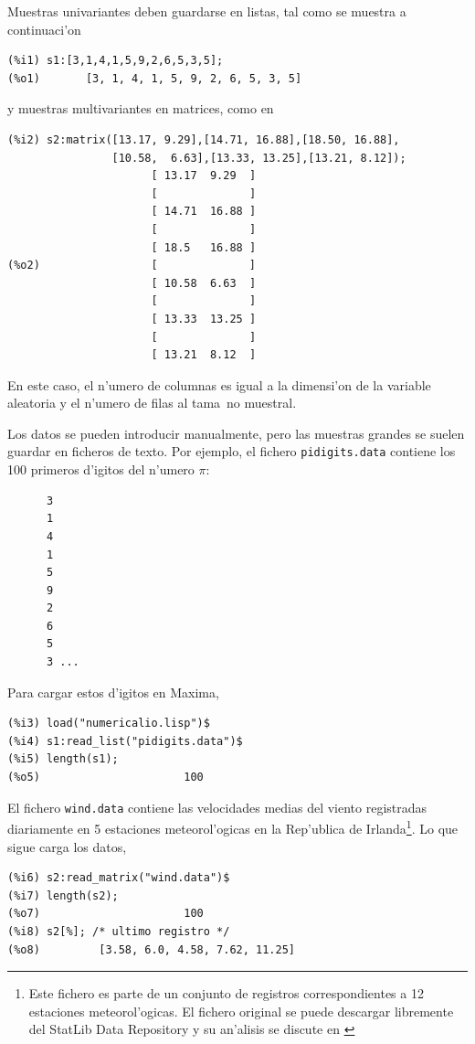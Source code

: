 \documentclass[spanish,12pt,a4paper]{article}
\begin{document}
Muestras univariantes deben guardarse en listas, tal como se muestra a continuaci'on
\begin{verbatim}
(%i1) s1:[3,1,4,1,5,9,2,6,5,3,5];
(%o1)       [3, 1, 4, 1, 5, 9, 2, 6, 5, 3, 5]
\end{verbatim}
y muestras multivariantes en matrices, como en
\begin{verbatim}
(%i2) s2:matrix([13.17, 9.29],[14.71, 16.88],[18.50, 16.88],
                [10.58,  6.63],[13.33, 13.25],[13.21, 8.12]);
                      [ 13.17  9.29  ]
                      [              ]
                      [ 14.71  16.88 ]
                      [              ]
                      [ 18.5   16.88 ]
(%o2)                 [              ]
                      [ 10.58  6.63  ]
                      [              ]
                      [ 13.33  13.25 ]
                      [              ]
                      [ 13.21  8.12  ]
\end{verbatim}
En este caso, el n'umero de columnas es igual a la dimensi'on de la variable aleatoria y el n'umero de filas al tama~no muestral.

Los datos se pueden introducir manualmente, pero las muestras grandes se suelen guardar en ficheros de texto. Por ejemplo, el fichero \verb|pidigits.data| contiene los 100 primeros d'igitos del n'umero $\pi$:
\begin{verbatim}
      3
      1
      4
      1
      5
      9
      2
      6
      5
      3 ...
\end{verbatim}

Para cargar estos d'igitos en Maxima,
\begin{verbatim}
(%i3) load("numericalio.lisp")$
(%i4) s1:read_list("pidigits.data")$
(%i5) length(s1);
(%o5)                      100
\end{verbatim}

El fichero \verb|wind.data| contiene las velocidades medias del viento registradas diariamente en 5 estaciones meteorol'ogicas en la Rep'ublica de Irlanda\footnote{Este fichero es parte de un conjunto de registros correspondientes a 12 estaciones meteorol'ogicas. El fichero original se puede descargar libremente del StatLib Data Repository y su an'alisis se discute en \cite{hasl}}. Lo que sigue carga los datos,
\begin{verbatim}
(%i6) s2:read_matrix("wind.data")$
(%i7) length(s2);
(%o7)                      100
(%i8) s2[%]; /* ultimo registro */
(%o8)         [3.58, 6.0, 4.58, 7.62, 11.25]
\end{verbatim}
\end{document}
